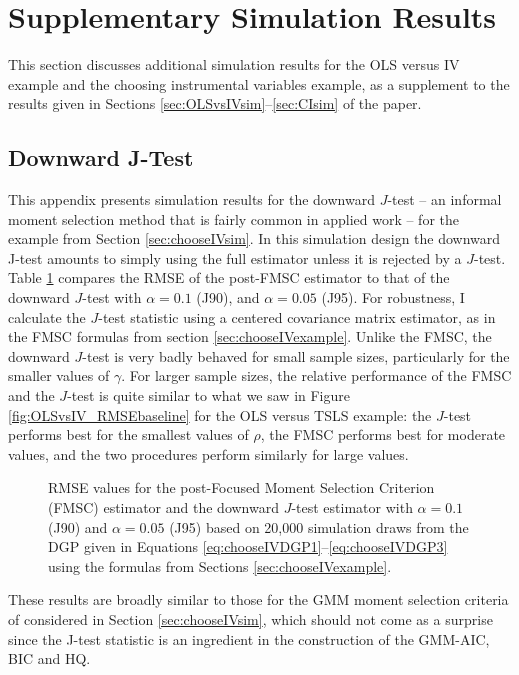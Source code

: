 \section{Supplementary Simulation Results}
\label{sec:simsupplement}
This section discusses additional simulation results for the OLS versus IV example and the choosing instrumental variables example, as a supplement to the results given in Sections \ref{sec:OLSvsIVsim}--\ref{sec:CIsim} of the paper.

\subsection{Downward J-Test}
\label{sec:downwardJ}
This appendix presents simulation results for the downward $J$-test -- an informal moment selection method that is fairly common in applied work -- for the example from Section \ref{sec:chooseIVsim}.
In this simulation design the downward J-test amounts to simply using the full estimator unless it is rejected by a $J$-test.
Table \ref{fig:chooseIVsim_RMSErelJ} compares the RMSE of the post-FMSC estimator to that of the downward $J$-test with $\alpha = 0.1$ (J90), and $\alpha = 0.05$ (J95).
For robustness, I calculate the $J$-test statistic using a centered covariance matrix estimator, as in the FMSC formulas from section \ref{sec:chooseIVexample}.
Unlike the FMSC, the downward $J$-test is very badly behaved for small sample sizes, particularly for the smaller values of $\gamma$.
For larger sample sizes, the relative performance of the FMSC and the $J$-test is quite similar to what we saw in Figure \ref{fig:OLSvsIV_RMSEbaseline} for the OLS versus TSLS example: the $J$-test performs best for the smallest values of $\rho$, the FMSC performs best for moderate values, and the two procedures perform similarly for large values.
\begin{figure}
\centering
	
	\caption{RMSE values for the post-Focused Moment Selection Criterion (FMSC) estimator and the downward $J$-test estimator with $\alpha = 0.1$ (J90) and $\alpha = 0.05$ (J95) based on 20,000 simulation draws from the DGP given in Equations \ref{eq:chooseIVDGP1}--\ref{eq:chooseIVDGP3} using the formulas from Sections \ref{sec:chooseIVexample}.}
	\label{fig:chooseIVsim_RMSErelJ}
\end{figure}
These results are broadly similar to those for the GMM moment selection criteria of \cite{Andrews1999} considered in Section \ref{sec:chooseIVsim}, which should not come as a surprise since the J-test statistic is an ingredient in the construction of the GMM-AIC, BIC and HQ. 

